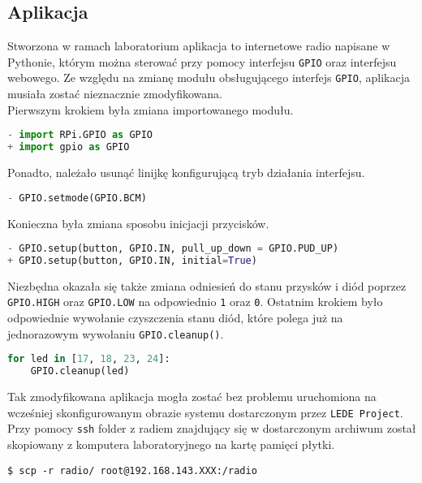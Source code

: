 \documentclass[10pt,a4paper]{article}
\begin{document}
\subsection{Aplikacja}
Stworzona w ramach laboratorium aplikacja to internetowe radio napisane w Pythonie, którym można sterować przy pomocy interfejsu \texttt{GPIO} oraz interfejsu webowego. Ze względu na zmianę modułu obsługującego interfejs \texttt{GPIO}, aplikacja musiała zostać nieznacznie zmodyfikowana.\\[\baselineskip]
Pierwszym krokiem była zmiana importowanego modułu.
\begin{lstlisting}[style=bash, language=python]
- import RPi.GPIO as GPIO
+ import gpio as GPIO
\end{lstlisting}
Ponadto, należało usunąć linijkę konfigurującą tryb działania interfejsu.
\begin{lstlisting}[style=bash, language=python]
- GPIO.setmode(GPIO.BCM)
\end{lstlisting}
Konieczna była zmiana sposobu inicjacji przycisków.
\begin{lstlisting}[style=bash, language=python]
- GPIO.setup(button, GPIO.IN, pull_up_down = GPIO.PUD_UP)
+ GPIO.setup(button, GPIO.IN, initial=True)
\end{lstlisting}
Niezbędna okazała się także zmiana odniesień do stanu przysków i diód poprzez \texttt{GPIO.HIGH} oraz \texttt{GPIO.LOW} na odpowiednio \texttt{1} oraz \texttt{0}. Ostatnim krokiem było odpowiednie wywołanie czyszczenia stanu diód, które polega już na jednorazowym wywołaniu \texttt{GPIO.cleanup()}.
\begin{lstlisting}[style=bash, language=python]
for led in [17, 18, 23, 24]:
    GPIO.cleanup(led)
\end{lstlisting}
Tak zmodyfikowana aplikacja mogła zostać bez problemu uruchomiona na wcześniej skonfigurowanym obrazie systemu dostarczonym przez \texttt{LEDE Project}. Przy pomocy \texttt{ssh} folder z radiem znajdujący się w dostarczonym archiwum został skopiowany z komputera laboratoryjnego na kartę pamięci płytki.
\begin{lstlisting}[style=bash]
$ scp -r radio/ root@192.168.143.XXX:/radio
\end{lstlisting}
\end{document}
